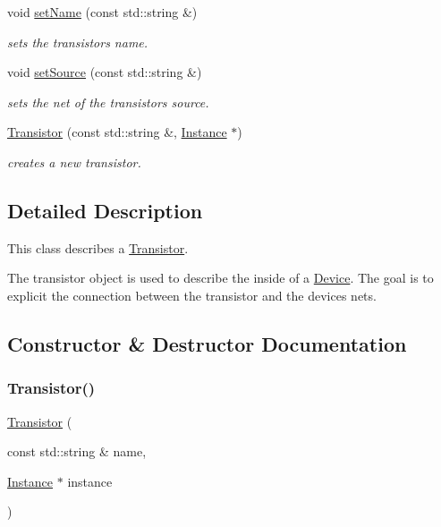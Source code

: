 \begin{DoxyCompactItemize}
void \hyperlink{class_open_chams_1_1_transistor_a36c59a26f0317be12cea01f8dea24ec7}{set\+Name} (const std\+::string \&)
\begin{DoxyCompactList}\small\item\em sets the transistor\textquotesingle{}s name. \end{DoxyCompactList}\item 
void \hyperlink{class_open_chams_1_1_transistor_abc4a5d86e639ea13e27551722e2f9c17}{set\+Source} (const std\+::string \&)
\begin{DoxyCompactList}\small\item\em sets the net of the transistor\textquotesingle{}s source. \end{DoxyCompactList}\item 
\hyperlink{class_open_chams_1_1_transistor_a5052d5c281f8798a0b10ebfe4c0296a5}{Transistor} (const std\+::string \&, \hyperlink{class_open_chams_1_1_instance}{Instance} $\ast$)
\begin{DoxyCompactList}\small\item\em creates a new transistor. \end{DoxyCompactList}\end{DoxyCompactItemize}


\subsection{Detailed Description}
This class describes a \hyperlink{class_open_chams_1_1_transistor}{Transistor}.

The transistor object is used to describe the inside of a \hyperlink{class_open_chams_1_1_device}{Device}. The goal is to explicit the connection between the transistor and the device\textquotesingle{}s nets. 

\subsection{Constructor \& Destructor Documentation}
\mbox{\label{class_open_chams_1_1_transistor_a5052d5c281f8798a0b10ebfe4c0296a5}} 
\subsubsection{\texorpdfstring{Transistor()}{Transistor()}}
{\footnotesize\ttfamily \hyperlink{class_open_chams_1_1_transistor}{Transistor} (\begin{DoxyParamCaption}\item[{const std\+::string \&}]{name,  }\item[{\hyperlink{class_open_chams_1_1_instance}{Instance} $\ast$}]{instance }\end{DoxyParamCaption})}



